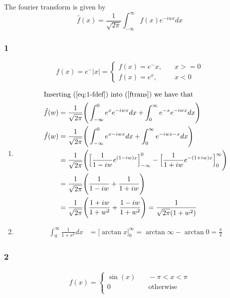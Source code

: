 \documentclass[a4paper]{article}
\newcommand{\ex}[1]{\subsubsection*{#1}}
\begin{document}
\pagestyle{fancy} %



The fourier transform is given by
\[\hat f(x) = \frac{1}{\sqrt{2\pi}}\int_{-\infty}^{\infty}{f(x)e^{-iwx} dx}
    \label{ftrans}\]


\ex{1}
\[ f(x) = e^-|x| = 
    \begin{cases}
        f(x) = e^-x, &\quad x >= 0 \\
        f(x) = e^x, &\quad x < 0 
    \end{cases} \label{eq:1-fdef} \]

\begin{enumerate}[label=\alph*)]
    \item { 
        \begin{align}
            \intertext{Inserting (\ref{eq:1-fdef}) into (\ref{ftrans}) we have that}
            \hat f(w) &= \frac{1}{\sqrt{2\pi}}\Bigg(\int_{-\infty}^0{e^x
                e^{-iwx} dx} + \int_0^{\infty}{e^{-x} e^{-iwx} dx}\Bigg) \\
            \hat f(w) &= \frac{1}{\sqrt{2\pi}}\Bigg(\int_{-\infty}^0{e^{x-iwx}dx} 
                + \int_0^{\infty}{e^{-iwx-x} dx}\Bigg) \\
            &= \frac{1}{\sqrt{2\pi}}\Bigg(\Big[{\frac{1}{1-iw}e^{(1-iw)x}\Big]_
                {-\infty}^{0}} - \Big[{\frac{1}{1+iw}
                e^{-(1+iw)x}\Big]_{0}^{\infty}}\Bigg) \\
            &= \frac{1}{\sqrt{2\pi}}\Bigg(\frac{1}{1-iw} + \frac{1}{1+iw}\Bigg) \\
            &= \frac{1}{\sqrt{2\pi}}\Bigg(\frac{1+iw}{1+w^2} +
                \frac{1-iw}{1+w^2}\Bigg) = \frac{1}{\sqrt{2\pi}(1 + w^2)}\\
        \end{align}
    }

    \item{  %
        \begin{align}
            \int_0^\infty{\frac{1}{1+x^2} dx} &= \Big[\arctan x\Big]_0^\infty =
                \arctan \infty - \arctan 0 = \frac{\pi}{2}
        \end{align}
    }
\end{enumerate}

\ex{2}

\begin{align}
f(x) = 
    \begin{cases}
        \sin(x) &\quad -\pi < x < \pi \\
        0 &\quad \text{otherwise} \\
    \end{cases}
\end{align}
\end{document}
